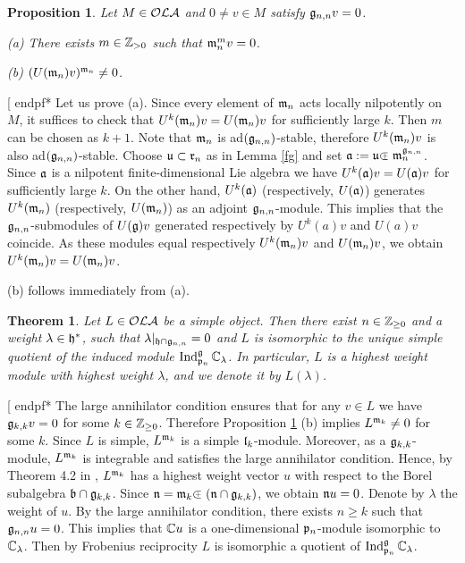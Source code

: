 \documentclass[12pt]{amsart}
\makeatletter
\def\mathbb{\Bbb}
\def\mathfrak{\frak}
\newenvironment{proof}{%
         \@ifnextchar[{%
                       \expandafter\let\expandafter\end@proof
                         \csname endpf*\endcsname
                         \my@proof
                      }{\let\end@proof\endpf\pf}%
        }{\end@proof}
\def\my@proof[#1]{\@nameuse{pf*}{#1}}
\def\mathcal{\cal}
\def\@putname#1#2#3#4{\def\@@ref{#3}\let\old@bf\bf
        \def\bf##1{\old@bf\if?\noexpand##1?{#4}\else##1\fi}%
        #1{#2}%
        \let\bf\old@bf}
\def\@putname#1#2#3#4{\def\@@ref{#3}\let\old@bf\bf    %
        \let\old@reset@font\reset@font                  %
        \def\bf##1{\old@bf\if?\noexpand##1?{#4}\else##1\fi}%
        \def\reset@font##1##2{\old@reset@font##1\if?\noexpand##2?{#4}\else##2\fi}#1{#2}%
        \let\bf\old@bf\let\reset@font\old@reset@font}
\let\my@ref=\ref
\def\ref#1{\@putname\my@ref{#1}{#1}{\tiny\rm\@@ref}}
\let\my@cite=\cite
\def\cite#1{\@putname\my@cite{#1}{\@citeb}{\tiny\rm\@@ref}}
\theoremstyle{plain} %
\numberwithin{equation}{section}
\theoremstyle{definition}
\theoremstyle{remark}
\theoremstyle{plain} %
\newtheorem{theorem}[definition]{Theorem}
\newtheorem{proposition}[definition]{Proposition}
\newcommand{\fg}{\mathfrak{g}}
\newcommand{\fp}{\mathfrak{p}}
\newcommand{\fr}{\mathfrak{r}}
\newcommand{\fn}{\mathfrak{n}}
\newcommand{\fb}{\mathfrak{b}}
\newcommand{\fm}{\mathfrak{m}}
\newcommand{\fl}{\mathfrak{l}}
\newcommand{\fh}{\mathfrak{h}}
\def\clplus{\hbox{$\subset${\raise0.3ex\hbox{\kern -0.55em ${\scriptscriptstyle +}$}}\ }}
\makeatother
\begin{document}
\begin{proposition}\label{glnil} Let $M\in\mathcal{OLA}$ and   $0\neq v\in M$ satisfy $\fg_{n,n}v=0$.
  
(a) There exists $m\in\mathbb Z_{>0}$ such that $\fm_n^mv=0$.
  
(b) $(U(\fm_{n})v)^{\fm_n}\neq 0$.
\end{proposition}
\begin{proof} Let us prove (a). Since every element of $\fm_n$ acts locally nilpotently on $M$, it suffices to check that
  $U^k(\fm_n)v=U(\fm_n)v$ for sufficiently large $k$. Then $m$ can be chosen as $k+1$. Note that $\fm_n$ is  ad$(\fg_{n,n})$-stable, therefore $U^k(\fm_n)v$ is also ad$(\fg_{n,n})$-stable. Choose $\mathfrak{u}\subset\fr_n$ as in Lemma \ref{fg} and set $\mathfrak{a}:=\mathfrak{u}{\clplus} \fm_n^{\fg_{n,n}}$.
  Since $\mathfrak{a}$ is a nilpotent finite-dimensional Lie algebra we have  $U^k(\mathfrak{a})v=U(\mathfrak{a})v$ for sufficiently large $k$. On the other hand, $U^k(\mathfrak{a})$ 
  (respectively, $U(\mathfrak{a})$) generates  $U^k(\fm_n)$  (respectively, $U(\fm_n)$) as an adjoint $\fg_{n,n}$-module.  This implies that the $\fg_{n,n}$-submodules of $U(\fg)v$ generated respectively by $U^k(a)v$ and $U(a)v$ coincide. {As} these modules equal respectively
  $U^k(\fm_n)v$ and  $U(\fm_n)v$, we obtain  $U^k(\fm_n)v=U(\fm_n)v$.
 
(b) follows immediately from (a).
  \end{proof}

\begin{theorem}\label{simple} Let $L\in\mathcal{OLA}$ be a simple object. Then there exist $n\in\mathbb Z_{\geq 0}$ and
a weight $\lambda\in \fh^*$, such that $\lambda|_{\fh\cap \fg_{n,n}}=0$ and $L$ is isomorphic to the unique simple quotient of the induced module 
$\operatorname{Ind}^{\mathfrak g}_{\mathfrak p_n} \mathbb C_\lambda$. In particular, $L$ is a highest weight module with highest weight $\lambda$, and we denote it
by $L(\lambda)$.
\end{theorem}
\begin{proof} The large annihilator condition ensures that for any $v\in L$ we have $\fg_{k,k}v=0$ for some $k\in \mathbb{Z}_{\geq 0}$. Therefore Proposition \ref{glnil}(b) implies $L^{\fm_k}\neq 0$ for some $k$.
Since $L$ is simple,  $L^{\fm_k}$ is a simple $\fl_k$-module. Moreover, as a $\mathfrak{g}_{k,k}$-module,  $L^{\fm_k}$ is integrable and satisfies the large annihilator 
condition. Hence, by Theorem 4.2 in \cite{DPS}, $L^{\fm_k}$ has a highest weight vector $u$ with respect to the Borel 
subalgebra $\fb\cap\fg_{k,k}$. Since $\fn = \fm_k \clplus (\fn \cap \fg_{k,k})$, we obtain $\fn u=0$. Denote by $\lambda$ the weight of $u$. 
By the large annihilator condition, there exists $n\geq k$ such that $\fg_{n,n} u=0$. This implies that $\mathbb C u$ is a one-dimensional
$\fp_n$-module isomorphic to $\mathbb C_\lambda$.
Then by Frobenius reciprocity $L$ is isomorphic a quotient of $\operatorname{Ind}^{\mathfrak g}_{\mathfrak p_n} \mathbb C_\lambda$. 
\end{proof}
\end{document}
